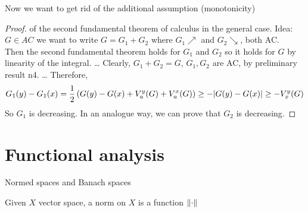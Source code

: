 Now we want to get rid of the additional assumption (monotonicity)

\begin{proof}
    of the second fundamental theorem of calculus in the general case.
    Idea:  \(G \in AC\) 
    we want to write \(G= G_1 + G_2\) where \(G_1 \nearrow \) and \(G_2 \searrow\), both AC. \\
    Then the second fundamental theorem holds for \(G_1 \) and \(G_2\) so it holds for \(G\) by linearity of the integral. 
    \dots
    Clearly, \(G_1+G_2 = G\), \(G_1, G_2\) are AC, by preliminary result n4.
    \dots
    Therefore, 
    \[
        G_1 (y) - G_1(x) = \frac{1}{2} \left(G(y) - G(x) + V_a^y(G) + V_a^x(G)\right) \geq - \abs{G(y) - G(x)} \geq - V_x^y(G)
    \]
    So \(G_1\) is decreasing. In an analogue way, we can prove that \(G_2\) is decreasing.
\end{proof}

\section*{Functional analysis}
Normed spaces and Banach spaces
\begin{definition}
    Given \(X\) vector space, a norm on \(X\) is a function \(\norm{\cdot}\)
\end{definition}
